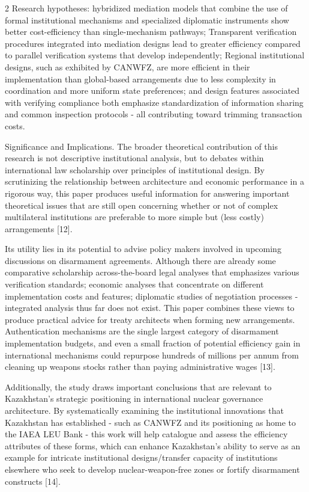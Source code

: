 \begin{multicols}{2}
Research hypotheses: hybridized mediation models that combine the use of
formal institutional mechanisms and specialized diplomatic instruments
show better cost-efficiency than single-mechanism pathways; Transparent
verification procedures integrated into mediation designs lead to
greater efficiency compared to parallel verification systems that
develop independently; Regional institutional designs, such as exhibited
by CANWFZ, are more efficient in their implementation than global-based
arrangements due to less complexity in coordination and more uniform
state preferences; and design features associated with verifying
compliance both emphasize standardization of information sharing and
common inspection protocols - all contributing toward trimming
transaction costs.

Significance and Implications. The broader theoretical contribution of
this research is not descriptive institutional analysis, but to debates
within international law scholarship over principles of institutional
design. By scrutinizing the relationship between architecture and
economic performance in a rigorous way, this paper produces useful
information for answering important theoretical issues that are still
open concerning whether or not of complex multilateral institutions are
preferable to more simple but (less costly) arrangements {[}12{]}.

Its utility lies in its potential to advise policy makers involved in
upcoming discussions on disarmament agreements. Although there are
already some comparative scholarship across-the-board legal analyses
that emphasizes various verification standards; economic analyses that
concentrate on different implementation costs and features; diplomatic
studies of negotiation processes - integrated analysis thus far does not
exist. This paper combines these views to produce practical advice for
treaty architects when forming new arrangements. Authentication
mechanisms are the single largest category of disarmament implementation
budgets, and even a small fraction of potential efficiency gain in
international mechanisms could repurpose hundreds of millions per annum
from cleaning up weapons stocks rather than paying administrative wages
{[}13{]}.

Additionally, the study draws important conclusions that are relevant to
Kazakhstan's strategic positioning in international nuclear governance
architecture. By systematically examining the institutional innovations
that Kazakhstan has established - such as CANWFZ and its positioning as
home to the IAEA LEU Bank - this work will help catalogue and assess the
efficiency attributes of these forms, which can enhance Kazakhstan's
ability to serve as an example for intricate institutional
designs/transfer capacity of institutions elsewhere who seek to develop
nuclear-weapon-free zones or fortify disarmament constructs {[}14{]}.


\end{multicols}

